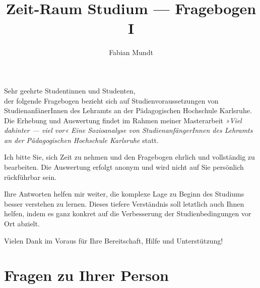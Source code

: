 \documentclass[
  german,
  globalid=Inventionate,
  print_questionnaire_id,
  oneside,
  pagemark,
  stamp]{sdaps}
\author{Fabian Mundt}
\title{Zeit-Raum Studium --- Fragebogen I}
\begin{document}

  \begin{questionnaire}
    \begin{info}
	Sehr geehrte Studentinnen und Studenten,\\

	der folgende Fragebogen bezieht sich auf Studienvoraussetzungen von StudienanfänerInnen des Lehramts an der Pädagogischen Hochschule Karlsruhe. Die Erhebung und Auswertung findet im Rahmen meiner Masterarbeit \textit{»Viel dahinter --- viel vor« Eine Sozioanalyse von StudienanfängerInnen des Lehramts an der Pädagogischen Hochschule Karlsruhe} statt.

	\vspace{.5em}

	Ich bitte Sie, sich Zeit zu nehmen und den Fragebogen ehrlich und vollständig zu bearbeiten. Die Auswertung erfolgt anonym und wird nicht auf Sie persönlich rückführbar sein.

	\vspace{.5em}

	Ihre Antworten helfen mir weiter, die komplexe Lage zu Beginn des Studiums besser verstehen zu lernen. Dieses tiefere Verständnis soll letztlich auch Ihnen helfen, indem es ganz konkret auf die Verbesserung der Studienbedingungen vor Ort abzielt.


	\vspace{.5em}

	Vielen Dank im Voraus für Ihre Bereitschaft, Hilfe und Unterstützung!

    \end{info}


    \section{Fragen zu Ihrer Person}


\end{questionnaire}
\end{document}

